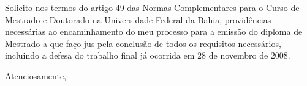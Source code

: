 \documentclass[12pt]{letter}
\begin{document}
\begin{letter}
\address{Prof. Dr. Ricardo Mazzini Bordini \\ MD. Coordenador do Programa de
  Pós-Graduação em Música da UFBA}
\signature{Marcos da Silva Sampaio}

\thispagestyle{empty}
\opening{}

Solicito nos termos do artigo 49 das Normas Complementares para o
Curso de Mestrado e Doutorado na Universidade Federal da Bahia,
providências necessárias ao encaminhamento do meu processo para a
emissão do diploma de Mestrado a que faço jus pela conclusão de todos
os requisitos necessários, incluindo a defesa do trabalho final já
ocorrida em 28 de novembro de 2008.

\closing{Atenciosamente,}

\end{letter}
\end{document}
